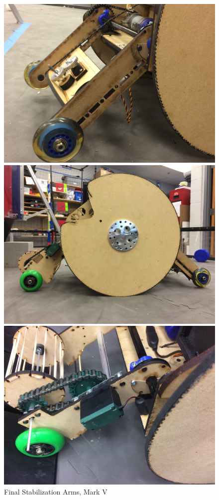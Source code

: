 \begin{figure}[h!]
\centering
\begin{minipage}{.32\textwidth}
  \centering
  \includegraphics[width= .9\linewidth]{Design_Overview/front_arm.JPG}
\end{minipage}%
\hfill
\begin{minipage}{.32\textwidth}
  \centering
  \includegraphics[width= .9\linewidth]{Design_Overview/both_arms.JPG}
	\caption{Final Stabilization Arms, Mark V}
	\label{fig:Triple_Arm_IMG}
\end{minipage}%
	\hfill
\begin{minipage}{.32\textwidth}
  \centering
  \includegraphics[width= .9\linewidth]{Design_Overview/rear_arm.JPG}

\end{minipage}
\end{figure}

